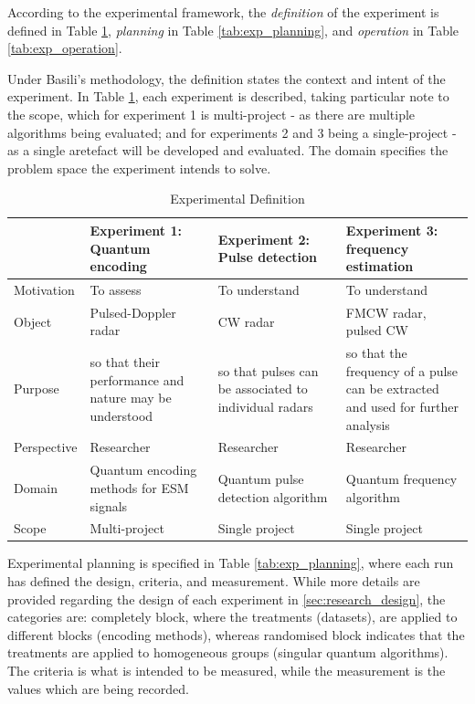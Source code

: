 According to the experimental framework, the \textit{definition} of the experiment is defined in Table \ref{tab:exp_definition}, \textit{planning} in Table \ref{tab:exp_planning}, and \textit{operation} in Table \ref{tab:exp_operation}.

Under Basili's methodology, the definition states the context and intent of the experiment.
In Table \ref{tab:exp_definition}, each experiment is described, taking particular note to the scope, which for experiment 1 is multi-project - as there are multiple algorithms being evaluated; and for experiments 2 and 3 being a single-project - as a single aretefact will be developed and evaluated.
The domain specifies the problem space the experiment intends to solve.


\begin{table}[ht]
\caption{Experimental Definition}
\label{tab:exp_definition}
\begin{tabular}{p{0.16\linewidth}|p{0.28\linewidth}p{0.28\linewidth}p{0.28\linewidth}}
\hline
& Experiment 1: Quantum encoding & Experiment 2: Pulse detection & Experiment 3: frequency estimation \\
\hline
Motivation & To assess & To understand & To understand \\
Object & Pulsed-Doppler radar & \ac{CW} radar & \ac{FMCW} radar, pulsed \ac{CW} \\
Purpose & so that their performance and nature may be understood & so that pulses can be associated to individual radars & so that the frequency of a pulse can be extracted and used for further   analysis \\
Perspective & Researcher & Researcher & Researcher \\
Domain & Quantum encoding methods for ESM signals & Quantum pulse detection algorithm & Quantum frequency algorithm \\
Scope & Multi-project & Single project & Single project \\
\hline
\end{tabular}
\end{table}

Experimental planning is specified in Table \ref{tab:exp_planning}, where each run has defined the design, criteria, and measurement.
While more details are provided regarding the design of each experiment in \ref{sec:research_design}, the categories are: completely block, where the treatments (datasets), are applied to different blocks (encoding methods), whereas randomised block indicates that the treatments are applied to homogeneous groups (singular quantum algorithms).
The criteria is what is intended to be measured, while the measurement is the values which are being recorded.

